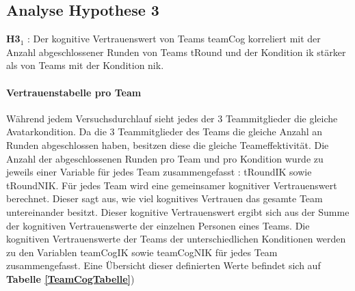 \documentclass[a4paper,11pt]{article}%
\renewcommand{\\}{\vspace*{0.5\baselineskip} \newline}
\begin{document}
\newpage
\subsection{Analyse Hypothese 3}
\textbf{H3$_{1}$} : Der kognitive Vertrauenswert von Teams \ac{teamCog} korreliert mit der Anzahl abgeschlossener Runden von Teams \ac{tRound} und der Kondition \ac{ik} stärker als von Teams mit der Kondition \ac{nik}.
%
%
%
\paragraph{Vertrauenstabelle pro Team}
Während jedem Versuchsdurchlauf sieht jedes der 3 Teammitglieder die gleiche Avatarkondition. Da die 3 Teammitglieder des Teams die gleiche Anzahl an Runden abgeschlossen haben, besitzen diese die gleiche Teameffektivität. Die Anzahl der abgeschlossenen Runden pro Team und pro Kondition wurde zu jeweils einer Variable für jedes Team zusammengefasst : \ac{tRoundIK} sowie \ac{tRoundNIK}. Für jedes Team wird eine gemeinsamer kognitiver Vertrauenswert berechnet. Dieser sagt aus, wie viel kognitives Vertrauen das gesamte Team untereinander besitzt. Dieser kognitive Vertrauenswert ergibt sich aus der Summe der kognitiven Vertrauenswerte der einzelnen Personen eines Teams. Die kognitiven Vertrauenswerte der Teams der unterschiedlichen Konditionen werden zu den Variablen \ac{teamCogIK} sowie \ac{teamCogNIK} für jedes Team zusammengefasst. Eine Übersicht dieser definierten Werte befindet sich auf \textbf{Tabelle \ref{TeamCogTabelle}})
\end{document}
